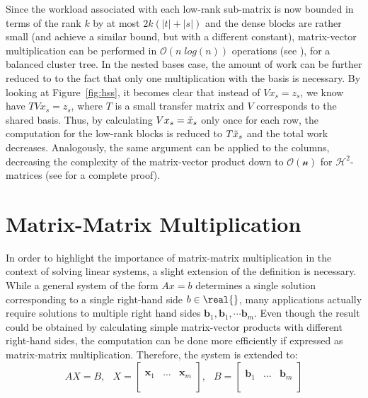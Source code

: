 \noindent Since the workload associated with each low-rank sub-matrix is now bounded in terms of the rank $k$ by at most $2k(|t|+|s|)$ and the dense blocks are rather small (and achieve a similar bound, but with a different constant), matrix-vector multiplication can be performed in $\mathcal{O}(n\;log(n))$ operations (see \cite{bebendorf_hierarchical_2008}), for a balanced cluster tree. In the nested bases case, the amount of work can be further reduced to to the fact that only one multiplication with the basis is necessary. By looking at Figure~\hyperref[fig:hss]{\ref{fig:hss}}, it becomes clear that instead of $Vx_s = z_s$, we know have $TVx_s = z_s$, where $T$ is a small transfer matrix and $V$ corresponds to the shared basis. Thus, by calculating $Vx_s = \Tilde{x}_s$ only once for each row, the computation for the low-rank blocks is reduced to $T\Tilde{x}_s$ and the total work decreases. Analogously, the same argument can be applied to the columns, decreasing the complexity of the matrix-vector product down to $\mathcal{O(n)}$ for $\mathcal{H}^2$-matrices (see \cite{hackbusch_hierarchical_2015} for a complete proof).

\section{Matrix-Matrix Multiplication}
\label{sec:matrix_matrix}

In order to highlight the importance of matrix-matrix multiplication in the context of solving linear systems, a slight extension of the definition is necessary. While a general system of the form $Ax=b$ determines a single solution corresponding to a single right-hand side $b \in \real{}$, many applications actually require solutions to multiple right hand sides $\bm{b}_1, \bm{b}_1, \cdots \bm{b}_m $. Even though the result could be obtained by calculating simple matrix-vector products with different right-hand sides, the computation can be done more efficiently if expressed as matrix-matrix multiplication. Therefore, the system is extended to:
\begin{equation}
    AX=B\text{, } \;\; X=
    \left[
    \begin{array}{c|c|c}
      & & \\
      \bm{x}_1 &\dots & \bm{x}_m \\
      & & \\
    \end{array}
  \right]\text{, } \;\;B=
    \left[
    \begin{array}{c|c|c}
      & & \\
      \bm{b}_1 &\dots & \bm{b}_m \\
      & & \\
    \end{array}
  \right] 
\end{equation}

